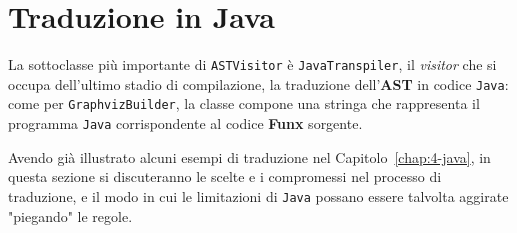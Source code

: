 \section{Traduzione in Java}
\label{sec:5-10-java-translation}

La sottoclasse più importante di \texttt{ASTVisitor} è \texttt{JavaTranspiler}, il \textit{visitor} che si occupa
dell'ultimo stadio di compilazione, la traduzione dell'\textbf{AST} in codice \texttt{Java}:
come per \texttt{GraphvizBuilder}, la classe compone una stringa
che rappresenta il programma \texttt{Java} corrispondente al codice \textbf{Funx} sorgente.


Avendo già illustrato alcuni esempi di traduzione nel Capitolo~\ref{chap:4-java}, in questa sezione si
discuteranno le scelte e i compromessi nel processo di traduzione, e il modo in cui le limitazioni
di \texttt{Java} possano essere talvolta aggirate "piegando" le regole.



\newpage








